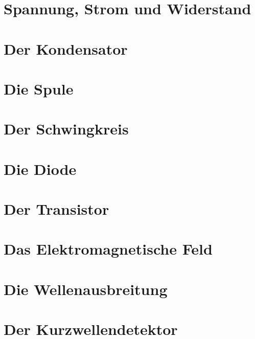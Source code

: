 \documentclass[ngerman, openany, twoside]{Script}
\begin{document}


\newpage

\chapter{Spannung, Strom und Widerstand}


\chapter{Der Kondensator}


\chapter{Die Spule}


\chapter{Der Schwingkreis}


\chapter{Die Diode}


\chapter{Der Transistor}


\newpage \vspace*{5cm}
\newpage

\chapter{Das Elektromagnetische Feld}


\newpage \vspace*{5cm}
\newpage

\chapter{Die Wellenausbreitung}


\chapter{Der Kurzwellendetektor}

\end{document}
